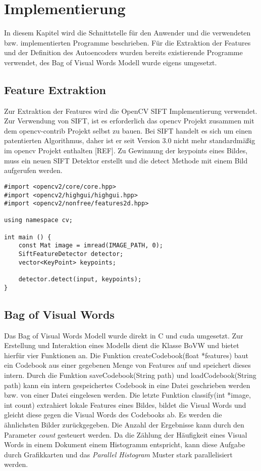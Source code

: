 \chapter{Implementierung}

In diesem Kapitel wird die Schnittstelle für den Anwender und die verwendeten bzw. implementierten Programme beschrieben. Für die Extraktion der Features und der Definition des Autoencoders wurden bereits existierende Programme verwendet, des Bag of Visual Words Modell wurde eigens umgesetzt.

\section{Feature Extraktion}

Zur Extraktion der Features wird die OpenCV SIFT Implementierung verwendet. Zur Verwendung von SIFT, ist es erforderlich das opencv Projekt zusammen mit dem opencv-contrib Projekt selbst zu bauen. Bei SIFT handelt es sich um einen patentierten Algorithmus, daher ist er seit Version 3.0 nicht mehr standardmäßig im opencv Projekt enthalten [REF]. Zu Gewinnung der keypoints eines Bildes, muss ein neuen SIFT Detektor erstellt und die detect Methode mit einem Bild aufgerufen werden.

\lstset{language=C}
\begin{lstlisting}
#import <opencv2/core/core.hpp>
#import <opencv2/highgui/highgui.hpp>
#import <opencv2/nonfree/features2d.hpp>

using namespace cv;

int main () {
	const Mat image = imread(IMAGE_PATH, 0);
	SiftFeatureDetector detector;
	vector<KeyPoint> keypoints;
	
	detector.detect(input, keypoints);
}
\end{lstlisting}

\section{Bag of Visual Words}

Das Bag of Visual Words Modell wurde direkt in C und cuda umgesetzt. Zur Erstellung und Interaktion eines Modells dient die Klasse BoVW und bietet hierfür vier Funktionen an. Die Funktion createCodebook(float *features) baut ein Codebook aus einer gegebenen  Menge von Features auf und speichert dieses intern. Durch die Funktion saveCodebook(String path) und loadCodebook(String path) kann ein intern gespeichertes Codebook in eine Datei geschrieben werden bzw. von einer Datei eingelesen werden. Die letzte Funktion classify(int *image, int count) extrahiert lokale Features eines Bildes, bildet die Visual Words und gleicht diese gegen die Visual Words des Codebooks ab. Es werden die ähnlichsten Bilder zurückgegeben. Die Anzahl der Ergebnisse kann durch den Parameter \textit{count} gesteuert werden. Da die Zählung der Häufigkeit eines Visual Words in einem Dokument einem Histogramm entspricht, kann diese Aufgabe durch Grafikkarten und das \textit{Parallel Histogram} Muster stark parallelisiert werden. 

